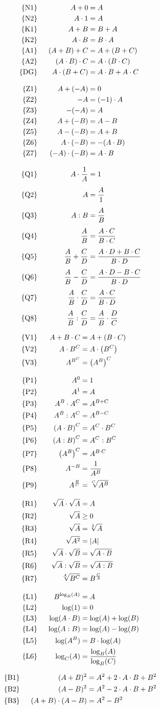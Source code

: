 \documentclass
[
  draft    = true,
  fontsize = 11pt,
  parskip  = half-,
  BCOR     = 0pt,
  DIV      = 11,
  ngerman,
  dvipsnames
]
{scrartcl}
\begin{document}
\begin{minipage}[t]{18em}
\vspace*{-\abovedisplayskip}
\begin{alignat*}{2}
  \axiome
  \\[2ex]
  \formelnZ
  \\[2ex]
  \formwlnQ
\end{alignat*}
\end{minipage}%
\hfill
\begin{minipage}[t]{18em}
\vspace*{-\abovedisplayskip}
\begin{alignat*}{2}
  \formwlnV
  \\[2ex]
  \formwlnP
  \\[2ex]
  \formwlnR
  \\[2ex]
  \formwlnL
\end{alignat*}
\end{minipage}
\par
\begin{alignat*}{2}
  \text{\{B1\}}&\;\; & (A+B)^2&=A^2+2\cdot A\cdot B+B^2 \\ \text{\{B2\}}&\;\; & (A-B)^2&=A^2-2\cdot A\cdot B+B^2 \\ \text{\{B3\}}&\;\; & (A+B)\cdot(A-B)&=A^2-B^2
\end{alignat*}

\end{document}
